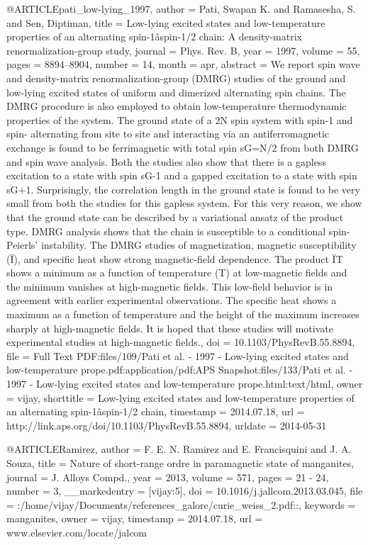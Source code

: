 @ARTICLE{pati_low-lying_1997,
  author = {Pati, Swapan K. and Ramasesha, S. and Sen, Diptiman},
  title = {Low-lying excited states and low-temperature properties of an alternating
	spin-1âspin-1/2 chain: A density-matrix renormalization-group study},
  journal = {Phys. Rev. B},
  year = {1997},
  volume = {55},
  pages = {8894--8904},
  number = {14},
  month = apr,
  abstract = {We report spin wave and density-matrix renormalization-group ({DMRG)}
	studies of the ground and low-lying excited states of uniform and
	dimerized alternating spin chains. The {DMRG} procedure is also employed
	to obtain low-temperature thermodynamic properties of the system.
	The ground state of a {2N} spin system with spin-1 and spin- alternating
	from site to site and interacting via an antiferromagnetic exchange
	is found to be ferrimagnetic with total spin {sG=N/2} from both {DMRG}
	and spin wave analysis. Both the studies also show that there is
	a gapless excitation to a state with spin {sG-1} and a gapped excitation
	to a state with spin {sG+1.} Surprisingly, the correlation length
	in the ground state is found to be very small from both the studies
	for this gapless system. For this very reason, we show that the ground
	state can be described by a variational ansatz of the product type.
	{DMRG} analysis shows that the chain is susceptible to a conditional
	spin-Peierls' instability. The {DMRG} studies of magnetization, magnetic
	susceptibility (Ï), and specific heat show strong magnetic-field
	dependence. The product {ÏT} shows a minimum as a function of temperature
	(T) at low-magnetic fields and the minimum vanishes at high-magnetic
	fields. This low-field behavior is in agreement with earlier experimental
	observations. The specific heat shows a maximum as a function of
	temperature and the height of the maximum increases sharply at high-magnetic
	fields. It is hoped that these studies will motivate experimental
	studies at high-magnetic fields.},
  doi = {10.1103/PhysRevB.55.8894},
  file = {Full Text PDF:files/109/Pati et al. - 1997 - Low-lying excited states and low-temperature prope.pdf:application/pdf;APS Snapshot:files/133/Pati et al. - 1997 - Low-lying excited states and low-temperature prope.html:text/html},
  owner = {vijay},
  shorttitle = {Low-lying excited states and low-temperature properties of an alternating
	spin-1âspin-1/2 chain},
  timestamp = {2014.07.18},
  url = {http://link.aps.org/doi/10.1103/PhysRevB.55.8894},
  urldate = {2014-05-31}
}

@ARTICLE{Ramirez,
  author = {F. E. N. Ramirez and E. Francisquini and J. A. Souza},
  title = {Nature of short-range ordre in paramagnetic state of manganites},
  journal = {J. Alloys Compd.},
  year = {2013},
  volume = {571},
  pages = {21 - 24},
  number = {3},
  __markedentry = {[vijay:5]},
  doi = {10.1016/j.jallcom.2013.03.045},
  file = {:/home/vijay/Documents/references_galore/curie_weiss_2.pdf::},
  keywords = {manganites},
  owner = {vijay},
  timestamp = {2014.07.18},
  url = {www.elsevier.com/locate/jalcom}
}

